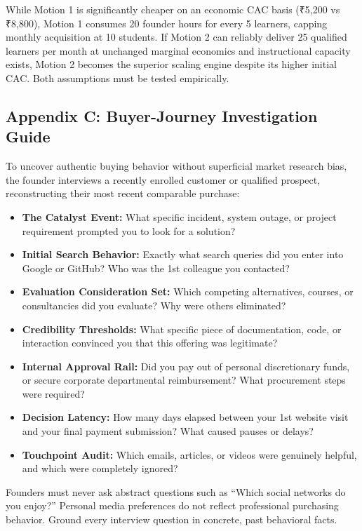 While Motion 1 is significantly cheaper on an economic CAC basis (₹5,200 vs ₹8,800), Motion 1 consumes 20 founder hours for every 5 learners, capping monthly acquisition at 10 students. If Motion 2 can reliably deliver 25 qualified learners per month at unchanged marginal economics and instructional capacity exists, Motion 2 becomes the superior scaling engine despite its higher initial CAC. Both assumptions must be tested empirically.

\subsection*{Appendix C: Buyer-Journey Investigation Guide}

To uncover authentic buying behavior without superficial market research bias, the founder interviews a recently enrolled customer or qualified prospect, reconstructing their most recent comparable purchase:
\begin{itemize}[leftmargin=*,itemsep=1pt]
  \item \textbf{The Catalyst Event:} What specific incident, system outage, or project requirement prompted you to look for a solution?
  \item \textbf{Initial Search Behavior:} Exactly what search queries did you enter into Google or GitHub? Who was the 1st colleague you contacted?
  \item \textbf{Evaluation Consideration Set:} Which competing alternatives, courses, or consultancies did you evaluate? Why were others eliminated?
  \item \textbf{Credibility Thresholds:} What specific piece of documentation, code, or interaction convinced you that this offering was legitimate?
  \item \textbf{Internal Approval Rail:} Did you pay out of personal discretionary funds, or secure corporate departmental reimbursement? What procurement steps were required?
  \item \textbf{Decision Latency:} How many days elapsed between your 1st website visit and your final payment submission? What caused pauses or delays?
  \item \textbf{Touchpoint Audit:} Which emails, articles, or videos were genuinely helpful, and which were completely ignored?
\end{itemize}

Founders must never ask abstract questions such as ``Which social networks do you enjoy?'' Personal media preferences do not reflect professional purchasing behavior. Ground every interview question in concrete, past behavioral facts.

